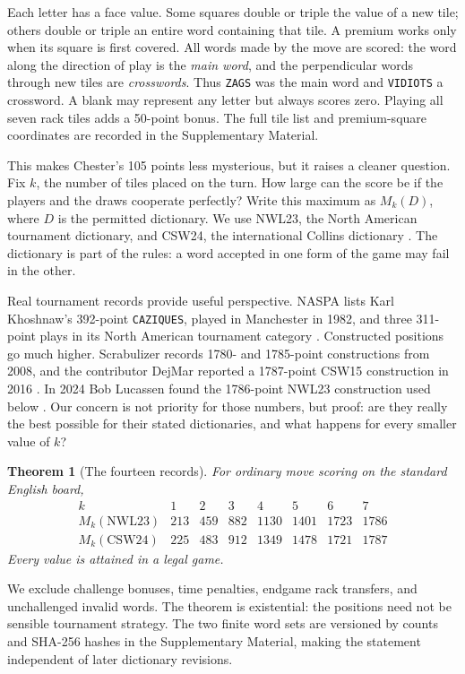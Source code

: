 \documentclass{article}
\theoremstyle{plain}
\newtheorem{theorem}{Theorem}
\newcommand{\word}[1]{\texttt{#1}}
\begin{document}
Each letter has a face value. Some squares double or triple the value of a new
tile; others double or triple an entire word containing that tile. A premium
works only when its square is first covered. All words made by the move are
scored: the word along the direction of play is the \emph{main word}, and the
perpendicular words through new tiles are \emph{crosswords}. Thus \word{ZAGS}
was the main word and \word{VIDIOTS} a crossword. A blank may represent any
letter but always scores zero. Playing all seven rack tiles adds a 50-point
bonus. The full tile list and premium-square coordinates are recorded in the
Supplementary Material.

This makes Chester's 105 points less mysterious, but it raises a cleaner
question. Fix $k$, the number of tiles placed on the turn. How large can the
score be if the players and the draws cooperate perfectly? Write this maximum
as $M_k(D)$, where $D$ is the permitted dictionary. We use NWL23, the North
American tournament dictionary, and CSW24, the international Collins
dictionary \cite{nwl,csw,wespa-open}. The dictionary is part of the rules: a
word accepted in one form of the game may fail in the other.

Real tournament records provide useful perspective. NASPA lists Karl
Khoshnaw's 392-point \word{CAZIQUES}, played in Manchester in 1982, and three
311-point plays in its North American tournament category \cite{naspa-records}.
Constructed positions go much higher. Scrabulizer records 1780- and 1785-point
constructions from 2008, and the contributor DejMar reported a 1787-point CSW15
construction in 2016 \cite{scrabulizer,dejmar}. In 2024 Bob Lucassen found the
1786-point NWL23 construction used below \cite{woogles}. Our concern is not
priority for those numbers, but proof: are they really the best possible for
their stated dictionaries, and what happens for every smaller value of $k$?

\begin{theorem}[The fourteen records]\label{thm:records}
For ordinary move scoring on the standard English board,
\[
\begin{array}{c|rrrrrrr}
k&1&2&3&4&5&6&7\\\hline
M_k(\mathrm{NWL23})&213&459&882&1130&1401&1723&1786\\
M_k(\mathrm{CSW24})&225&483&912&1349&1478&1721&1787
\end{array}
\]
Every value is attained in a legal game.
\end{theorem}

We exclude challenge bonuses, time penalties, endgame rack transfers, and
unchallenged invalid words. The theorem is existential: the positions need not
be sensible tournament strategy. The two finite word sets are versioned by
counts and SHA-256 hashes in the Supplementary Material, making the statement
independent of later dictionary revisions.
\end{document}
